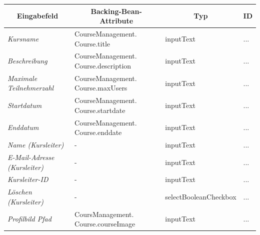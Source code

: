 \begin{itemize}
\begin{center}
\begin{longtable}{|p{3cm} |p{5cm} | p{4cm}|p{3cm}|}
						\hline \multicolumn{1}{|c|}{\textbf{Eingabefeld}} & \multicolumn{1}{|c|}{\textbf{Backing-Bean-Attribute}} & \multicolumn{1}{|c|}{\textbf{Typ}}  &  \multicolumn{1}{|c|}{\textbf{ID}} \\ \hline
						\endfirsthead
						\hline
						\endlastfoot
						\textit{Kursname} & CourseManagement. Course.title & inputText & ... \\ \hline
						\textit{Beschreibung} & CourseManagement. Course.description & inputText & ... \\ \hline
						\textit{Maximale Teilnehmerzahl} & CourseManagement. Course.maxUsers & inputText & ... \\ \hline
						\textit{Startdatum} & CourseManagement. Course.startdate & inputText & ... \\ \hline
						\textit{Enddatum} & CourseManagement. Course.enddate & inputText & ... \\ \hline
						\textit{Name (Kursleiter)} & - & inputText & ... \\ \hline
						\textit{E-Mail-Adresse (Kursleiter)} & - & inputText & ... \\ \hline
						\textit{Kursleiter-ID} & - & inputText & ... \\ \hline
						\textit{Löschen (Kursleiter)} & - & selectBooleanCheckbox & ... \\ \hline
						\textit{Profilbild Pfad} & CoursManagement. Course.courseImage & inputText & ... \\ \hline
					\end{longtable}
				\end{center}
				
				\begin{center}
					\begin{longtable}{|p{3cm} |p{8cm} | p{5cm}|}
						

\end{longtable}
\end{center}
\end{itemize}

